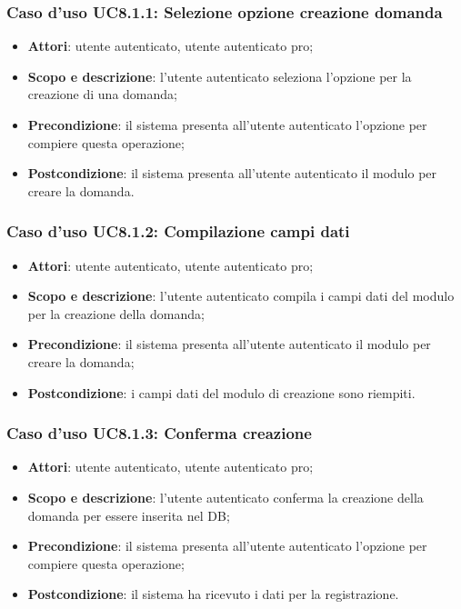 	\subsubsection{Caso d'uso UC8.1.1: Selezione opzione creazione domanda}
	\begin{itemize}
		\item
			\textbf{Attori}: utente autenticato, utente autenticato pro;
		\item
			\textbf{Scopo e descrizione}: l'utente autenticato seleziona l'opzione per la creazione di una domanda;
		\item		
			\textbf{Precondizione}: il sistema presenta all'utente autenticato l'opzione per compiere questa operazione;
		\item
			\textbf{Postcondizione}: il sistema presenta all'utente autenticato il modulo per creare la domanda.
	\end{itemize}	
	\subsubsection{Caso d'uso UC8.1.2: Compilazione campi dati}
	\begin{itemize}
		\item
			\textbf{Attori}: utente autenticato, utente autenticato pro;
		\item
			\textbf{Scopo e descrizione}: l'utente autenticato compila i campi dati del modulo per la creazione della domanda;
		\item		
			\textbf{Precondizione}: il sistema presenta all'utente autenticato il modulo per creare la domanda;
		\item
			\textbf{Postcondizione}: i campi dati del modulo di creazione sono riempiti.
	\end{itemize}	
	\subsubsection{Caso d'uso UC8.1.3: Conferma creazione}
	\begin{itemize}
		\item
			\textbf{Attori}: utente autenticato, utente autenticato pro;
		\item
			\textbf{Scopo e descrizione}: l'utente autenticato conferma la creazione della domanda per essere inserita nel DB;
		\item		
			\textbf{Precondizione}: il sistema presenta all'utente autenticato l'opzione per compiere questa operazione;
		\item
			\textbf{Postcondizione}: il sistema ha ricevuto i dati per la registrazione.
	\end{itemize}	
